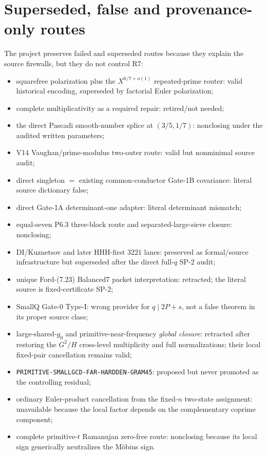 \documentclass[11pt]{article}
\theoremstyle{definition}
\newcommand{\1}{\mathbf 1}
\begin{document}
\section{Superseded, false and provenance-only routes}
\label{sec:provenance-only}

The project preserves failed and superseded routes because they explain the source
firewalls, but they do not control R7:
\begin{itemize}[leftmargin=1.6em]
\item squarefree polarization plus the $X^{6/7+o(1)}$ repeated-prime router:
  valid historical encoding, superseded by factorial Euler polarization;
\item complete multiplicativity as a required repair: retired/not needed;
\item the direct Pascadi smooth-number splice at $(3/5,1/7)$: nonclosing under the audited
  written parameters;
\item V14 Vaughan/prime-modulus two-outer route: valid but nonminimal source audit;
\item direct singleton $=$ existing common-conductor Gate-1B covariance: literal source
  dictionary false;
\item direct Gate-1A determinant-one adapter: literal determinant mismatch;
\item equal-seven P6.3 three-block route and separated-large-sieve closure: nonclosing;
\item DI/Kuznetsov and later HHH-first $3221$ lanes: preserved as formal/source
  infrastructure but superseded after the direct full-$q$ SP-2 audit;
\item unique Ford-(7.23) Balanced7 packet interpretation: retracted; the literal source is
  fixed-certificate SP-2;
\item SmallQ Gate-0 Type-I: wrong provider for $q\mid2P+s$, not a false theorem in its
  proper source class;
\item large-shared-$g_0$ and primitive-near-frequency \emph{global closure}: retracted
  after restoring the $G^2/H$ cross-level multiplicity and full normalizations; their local
  fixed-pair cancellation remains valid;
\item \texttt{PRIMITIVE-SMALLGCD-FAR-HARDDEN-GRAM45}: proposed but never promoted as the
  controlling residual;
\item ordinary Euler-product cancellation from the fixed-$n$ two-state assignment:
  unavailable because the local factor depends on the complementary coprime component;
\item complete primitive-$t$ Ramanujan zero-free route:
  nonclosing because its local sign generically neutralizes the M\"obius sign.
\end{itemize}
\end{document}
